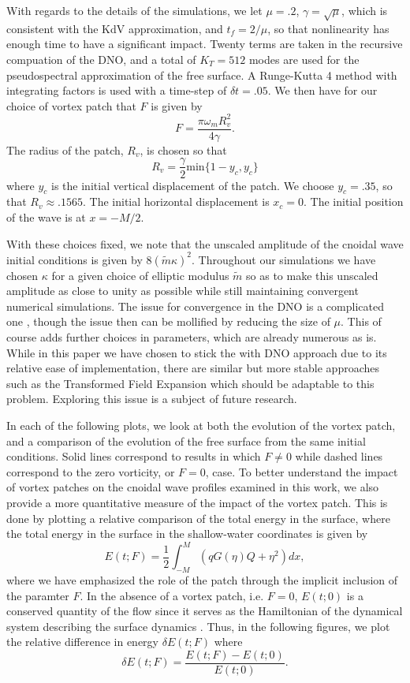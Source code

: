 \documentclass[a4paper,11pt]{article}
\begin{document}
With regards to the details of the simulations, we let $\mu=.2$, $\gamma = \sqrt{\mu}$, which is consistent with the KdV approximation, and $t_{f}=2/\mu$, so that nonlinearity has enough time to have a significant impact.  Twenty terms are taken in the recursive compuation of the DNO, and a total of $K_{T}=512$ modes are used for the pseudospectral approximation of the free surface.  A Runge-Kutta 4 method with integrating factors is used with a time-step of $\delta t = .05$.   We then have for our choice of vortex patch that $F$ is given by 
\[
F = \frac{\pi \omega_{m}R_{v}^{2}}{4\gamma}.
\]
The radius of the patch, $R_{v}$, is chosen so that
\[
R_{v} = \frac{\gamma}{2}\mbox{min}\{1-y_{c},y_{c}\}
\]
where $y_{c}$ is the initial vertical displacement of the patch.  We choose $y_{c}=.35$, so that $R_{v}\approx.1565$.  The initial horizontal displacement is $x_{c}=0$.  The initial position of the wave is at $x=-M/2$.  

With these choices fixed, we note that the unscaled amplitude of the cnoidal wave initial conditions is given by $8(\tilde{m}\kappa)^{2}$.  Throughout our simulations we have chosen $\kappa$ for a given choice of elliptic modulus $\tilde{m}$ so as to make this unscaled amplitude as close to unity as possible while still maintaining convergent numerical simulations.  The issue for convergence in the DNO is a complicated one \cite{guyenne,wilkening}, though the issue then can be mollified by reducing the size of $\mu$.  This of course adds further choices in parameters, which are already numerous as is.  While in this paper we have chosen to stick the with DNO approach due to its relative ease of implementation, there are similar but more stable approaches such as the Transformed Field Expansion \cite{nicholls} which should be adaptable to this problem.  Exploring this issue is a subject of future research.   

In each of the following plots, we look at both the evolution of the vortex patch, and a comparison of the evolution of the free surface from the same initial conditions.  Solid lines correspond to results in which $F\neq0$ while dashed lines correspond to the zero vorticity, or $F=0$, case.  To better understand the impact of vortex patches on the cnoidal wave profiles examined in this work, we also provide a more quantitative measure of the impact of the vortex patch.  This is done by plotting a relative comparison of the total energy in the surface, where the total energy in the surface in the shallow-water coordinates is given by 
\[
E(t;F) = \frac{1}{2}\int_{-M}^{M} \left(q G(\eta)Q  + \eta^{2}\right)dx,
\]
where we have emphasized the role of the patch through the implicit inclusion of the paramter $F$.  In the absence of a vortex patch, i.e. $F=0$, $E(t;0)$ is a conserved quantity of the flow since it serves as the Hamiltonian of the dynamical system describing the surface dynamics \cite{zakharov}.  Thus, in the following figures, we plot the relative difference in energy $\delta E(t;F)$ where
\[
\delta E(t;F) = \frac{E(t;F)-E(t;0)}{E(t;0)}.
\]
\end{document}
